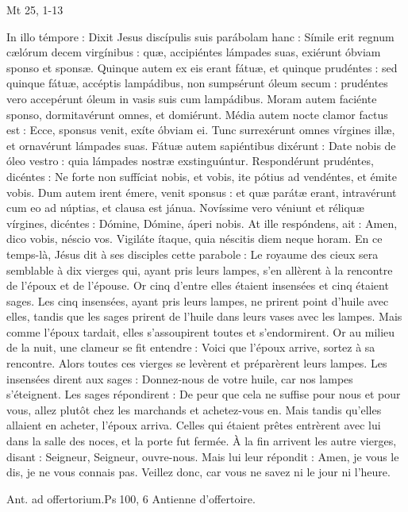 \begin{paracol}{2}
Mt 25, 1-13
\switchcolumn

\switchcolumn*

In illo témpore : Dixit Jesus discípulis  suis parábolam hanc : Símile erit regnum cælórum decem virgínibus : quæ, accipiéntes lámpades suas, exiérunt óbviam sponso et sponsæ. Quinque autem ex eis erant fátuæ, et quinque prudéntes : sed quinque fátuæ, accéptis lampádibus, non sumpsérunt óleum secum : prudéntes vero accepérunt óleum in vasis suis cum lampádibus. Moram autem faciénte sponso, dormitavérunt omnes, et domiérunt. Média autem nocte clamor factus est : Ecce, sponsus venit, exíte óbviam ei. Tunc surrexérunt omnes vírgines illæ, et ornavérunt lámpades suas. Fátuæ autem sapiéntibus dixérunt : Date nobis de óleo vestro : quia lámpades nostræ exstinguúntur. Respondérunt prudéntes, dicéntes : Ne forte non suffíciat nobis, et vobis, ite pótius ad vendéntes, et émite vobis. Dum autem irent émere, venit sponsus : et quæ parátæ erant, intravérunt cum eo ad núptias, et clausa est jánua. Novíssime vero véniunt et réliquæ vírgines, dicéntes : Dómine, Dómine, áperi nobis. At ille respóndens, ait : Amen, dico vobis, néscio vos. Vigiláte ítaque, quia néscitis diem neque horam.
\switchcolumn
En ce temps-là, Jésus dit à ses disciples  cette parabole : Le royaume des cieux sera semblable à dix vierges qui, ayant pris leurs lampes, s’en allèrent à la rencontre de l’époux et de l’épouse. Or cinq d’entre elles étaient insensées et cinq étaient sages. Les cinq insensées, ayant pris leurs lampes, ne prirent point d’huile avec elles, tandis que les sages prirent de l’huile dans leurs vases avec les lampes. Mais comme l’époux tardait, elles s’assoupirent toutes et s’endormirent. Or au milieu de la nuit, une clameur se fit entendre : Voici que l’époux arrive, sortez à sa rencontre. Alors toutes ces vierges se levèrent et préparèrent leurs lampes. Les insensées dirent aux sages : Donnez-nous de votre huile, car nos lampes s’éteignent. Les sages répondirent : De peur que cela ne suffise pour nous et pour vous, allez plutôt chez les marchands et achetez-vous en. Mais tandis qu’elles allaient en acheter, l’époux arriva. Celles qui étaient prêtes entrèrent avec lui dans la salle des noces, et la porte fut fermée. À la fin arrivent les autre vierges, disant : Seigneur, Seigneur, ouvre-nous. Mais lui leur répondit : Amen, je vous le dis, je ne vous connais pas. Veillez donc, car vous ne savez ni le jour ni l’heure.
\switchcolumn*

Ant. ad offertorium.\hfill Ps 100, 6
\switchcolumn
Antienne d’offertoire.
\switchcolumn*


\end{paracol}
